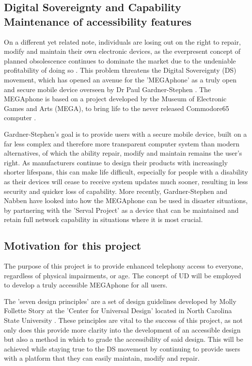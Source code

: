 \subsection{Digital Sovereignty and Capability Maintenance of accessibility features} %
On a different yet related note, individuals are losing out on the right to repair, modify and maintain their own electronic devices, as the everpresent concept of planned obsolescence continues to dominate the market due to the undeniable profitability of doing so \cite{obsolescence2}.
This problem threatens the Digital Sovereignty (DS) movement, which has opened an avenue for the 'MEGAphone' as a truly open and secure mobile device overseen by Dr Paul Gardner-Stephen \cite{mobilehistory}.
The MEGAphone is based on a project developed by the Museum of Electronic Games and Arts (MEGA), to bring life to the never released Commodore65 computer \cite{mega65}.

Gardner-Stephen's goal is to provide users with a secure mobile device, built on a far less complex and therefore more transparent computer system than modern alternatives, of which the ability repair, modify and maintain remains the user's right.
As manufacturers continue to design their products with increasingly shorter lifespans, this can make life difficult, especially for people with a disability as their devices will cease to receive system updates much sooner, resulting in less security and quicker loss of capability.
More recently, Gardner-Stephen and Nabben \cite{capability} have looked into how the MEGAphone can be used in disaster situations, by partnering with the 'Serval Project' \cite{serval} as a device that can be maintained and retain full network capability in situations where it is most crucial.

\subsection{Motivation for this project}
The purpose of this project is to provide enhanced telephony access to everyone, regardless of physical impairments, or age.
The concept of UD will be employed to develop a truly accessible MEGAphone for all users.

The 'seven design principles' are a set of design guidelines developed by Molly Follette Story at the 'Center for Universal Design' located in North Carolina State University \cite{sevenprinciples}.
These principles are vital to the success of this project, as not only does this provide more clarity into the development of an accessible design but also a method in which to grade the accessibility of said design.
This will be achieved while staying true to the DS movement by continuing to provide users with a platform that they can easily maintain, modify and repair.

